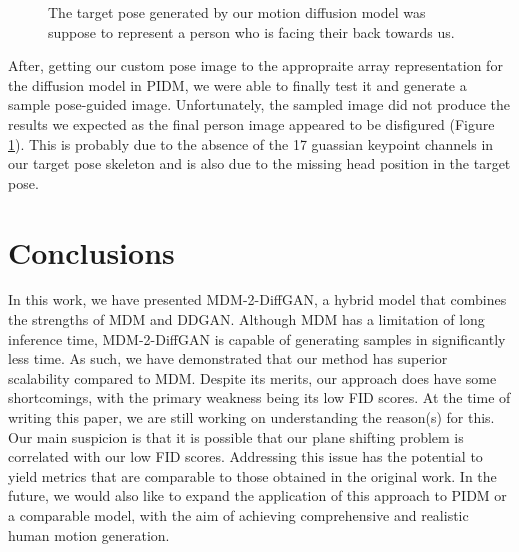 \documentclass[10pt,twocolumn,letterpaper]{article}
\begin{document}
\begin{figure}[H]
    \centering

    \caption{The target pose generated by our motion diffusion model was suppose to represent a 
    person who is facing their back towards us.}
    \label{fig:pidm-2}
\end{figure}


After, getting our custom pose image to the appropraite array representation for the diffusion model in PIDM, 
we were able to finally test it and generate a sample pose-guided image. Unfortunately, the sampled image 
did not produce the results we expected as the final person image appeared to be disfigured (Figure \ref{fig:pidm-2}). 
This is probably due to the absence of the 17 guassian keypoint channels in our target pose skeleton and 
is also due to the missing head position in the target pose.


\section{Conclusions}
\label{sec:conlusions}

In this work, we have presented MDM-2-DiffGAN, a hybrid model that combines the strengths of MDM and DDGAN. Although MDM has a 
limitation of long inference time, MDM-2-DiffGAN is capable of generating samples in significantly less time. As such, we have 
demonstrated that our method has superior scalability compared to MDM. Despite its merits, our approach does have some shortcomings,
with the primary weakness being its low FID scores. At the time of writing this paper, we are still working on understanding the 
reason(s) for this. Our main suspicion is that it is possible that our plane shifting problem is correlated with our low FID scores. 
Addressing this issue has the potential to yield metrics that are comparable to those obtained in the original work. In the future, 
we would also like to expand the application of this approach to PIDM or a comparable model, with the aim of achieving comprehensive 
and realistic human motion generation.
\end{document}
